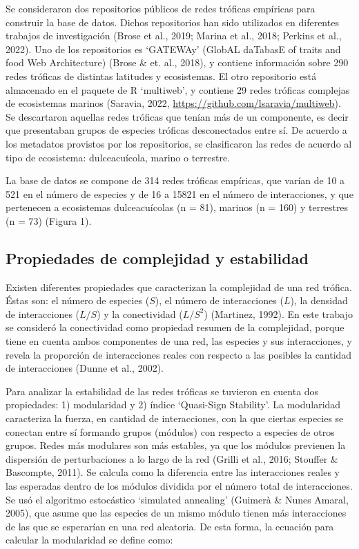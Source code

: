 \documentclass[
]{article}
\begin{document}
Se consideraron dos repositorios públicos de redes tróficas empíricas
para construir la base de datos. Dichos repositorios han sido utilizados
en diferentes trabajos de investigación (Brose et al., 2019; Marina et
al., 2018; Perkins et al., 2022). Uno de los repositorios es `GATEWAy'
(GlobAL daTabasE of traits and food Web Architecture) (Brose \& et. al.,
2018), y contiene información sobre 290 redes tróficas de distintas
latitudes y ecosistemas. El otro repositorio está almacenado en el
paquete de R `multiweb', y contiene 29 redes tróficas complejas de
ecosistemas marinos (Saravia, 2022,
\url{https://github.com/lsaravia/multiweb}). Se descartaron aquellas
redes tróficas que tenían más de un componente, es decir que presentaban
grupos de especies tróficas desconectados entre sí. De acuerdo a los
metadatos provistos por los repositorios, se clasificaron las redes de
acuerdo al tipo de ecosistema: dulceacuícola, marino o terrestre.

La base de datos se compone de 314 redes tróficas empíricas, que varían
de 10 a 521 en el número de especies y de 16 a 15821 en el número de
interacciones, y que pertenecen a ecosistemas dulceacuícolas (n = 81),
marinos (n = 160) y terrestres (n = 73) (Figura 1).

\hypertarget{propiedades-de-complejidad-y-estabilidad}{%
\subsection{Propiedades de complejidad y
estabilidad}\label{propiedades-de-complejidad-y-estabilidad}}

Existen diferentes propiedades que caracterizan la complejidad de una
red trófica. Éstas son: el número de especies (\(S\)), el número de
interacciones (\(L\)), la densidad de interacciones (\(L/S\)) y la
conectividad (\(L/S^2\)) (Martinez, 1992). En este trabajo se consideró
la conectividad como propiedad resumen de la complejidad, porque tiene
en cuenta ambos componentes de una red, las especies y sus
interacciones, y revela la proporción de interacciones reales con
respecto a las posibles la cantidad de interacciones (Dunne et al.,
2002).

Para analizar la estabilidad de las redes tróficas se tuvieron en cuenta
dos propiedades: 1) modularidad y 2) índice `Quasi-Sign Stability'. La
modularidad caracteriza la fuerza, en cantidad de interacciones, con la
que ciertas especies se conectan entre sí formando grupos (módulos) con
respecto a especies de otros grupos. Redes más modulares son más
estables, ya que los módulos previenen la dispersión de perturbaciones a
lo largo de la red (Grilli et al., 2016; Stouffer \& Bascompte, 2011).
Se calcula como la diferencia entre las interacciones reales y las
esperadas dentro de los módulos dividida por el número total de
interacciones. Se usó el algoritmo estocástico `simulated annealing'
(Guimerà \& Nunes Amaral, 2005), que asume que las especies de un mismo
módulo tienen más interacciones de las que se esperarían en una red
aleatoria. De esta forma, la ecuación para calcular la modularidad se
define como:
\end{document}
